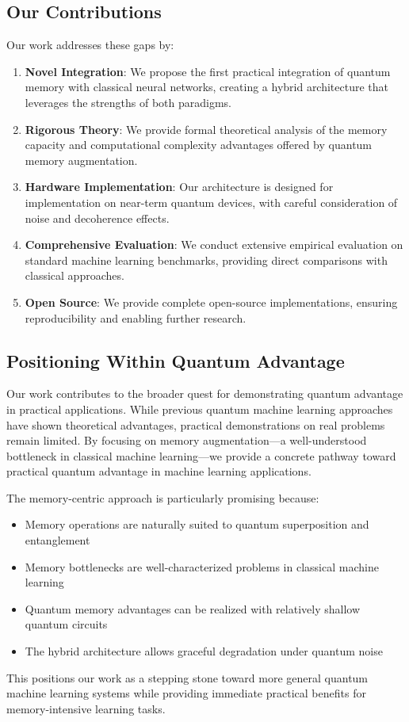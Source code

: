 \subsection{Our Contributions}

Our work addresses these gaps by:

\begin{enumerate}
    \item \textbf{Novel Integration}: We propose the first practical integration of quantum memory with classical neural networks, creating a hybrid architecture that leverages the strengths of both paradigms.
    
    \item \textbf{Rigorous Theory}: We provide formal theoretical analysis of the memory capacity and computational complexity advantages offered by quantum memory augmentation.
    
    \item \textbf{Hardware Implementation}: Our architecture is designed for implementation on near-term quantum devices, with careful consideration of noise and decoherence effects.
    
    \item \textbf{Comprehensive Evaluation}: We conduct extensive empirical evaluation on standard machine learning benchmarks, providing direct comparisons with classical approaches.
    
    \item \textbf{Open Source}: We provide complete open-source implementations, ensuring reproducibility and enabling further research.
\end{enumerate}

\subsection{Positioning Within Quantum Advantage}

Our work contributes to the broader quest for demonstrating quantum advantage in practical applications. While previous quantum machine learning approaches have shown theoretical advantages, practical demonstrations on real problems remain limited. By focusing on memory augmentation—a well-understood bottleneck in classical machine learning—we provide a concrete pathway toward practical quantum advantage in machine learning applications.

The memory-centric approach is particularly promising because:

\begin{itemize}
    \item Memory operations are naturally suited to quantum superposition and entanglement
    \item Memory bottlenecks are well-characterized problems in classical machine learning
    \item Quantum memory advantages can be realized with relatively shallow quantum circuits
    \item The hybrid architecture allows graceful degradation under quantum noise
\end{itemize}

This positions our work as a stepping stone toward more general quantum machine learning systems while providing immediate practical benefits for memory-intensive learning tasks.
